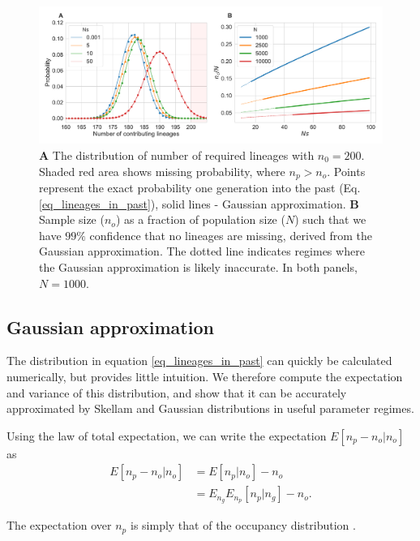 \documentclass[9pt,twocolumn,twoside,lineno]{gsajnl}
\begin{document}
\begin{figure}
  \centering
  \includegraphics[width=\columnwidth]{fig/combined.pdf}
  \caption{\textbf{A} The distribution of number of required lineages with $n_0=200$. Shaded
    red area shows missing probability, where $n_p > n_o$. Points represent the exact probability one
    generation into the past (Eq. \ref{eq_lineages_in_past}), solid lines - Gaussian approximation.
     \textbf{B} Sample size ($n_o$) as a fraction of population size ($N$)
    such that we have $99\%$ confidence that no lineages are missing, derived from the Gaussian
    approximation. The dotted line indicates regimes where the Gaussian approximation is likely inaccurate.
     In both panels, $N=1000$.}
  \label{fig_combined}
\end{figure}

\subsection{Gaussian approximation}
\label{subsec_gaussian}

The distribution in equation \ref{eq_lineages_in_past} can quickly be calculated numerically, but
provides little intuition. We therefore compute the
expectation and variance of this distribution, and show that it can be accurately approximated by
Skellam and Gaussian distributions in useful parameter regimes.

Using the law of total expectation, we can write the expectation $E[n_p-n_o | n_o]$ as
\begin{equation*}
  \begin{aligned}
    E[n_p-n_o | n_o] &=        E[n_p | n_o]       - n_o \\
                     &=E_{n_g} E_{n_p}[n_p | n_g] - n_o.
  \end{aligned}
\end{equation*}

The expectation over $n_p$ is simply that of the occupancy distribution \cite{Wakeley2009}.
\end{document}

